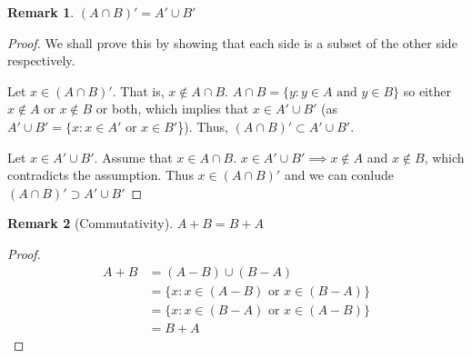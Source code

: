 \documentclass[12pt]{article}
\newtheorem{remark}{Remark}
\begin{document}
\begin{remark}
    $(A \cap B)' = A' \cup B'$
\end{remark}
\begin{proof}
    We shall prove this by showing that each side is a subset of the other side respectively.

    Let $x \in (A \cap B)'$. That is, $x \notin A \cap B$. $A \cap B = \{y: y \in A \text{ and } y \in B\}$
    so either $x \notin A$ or $x \notin B$ or both, which implies that
    $x \in A' \cup B'$ (as $A' \cup B' = \{x: x \in A' \text{ or } x \in B'$\}). Thus, $(A \cap B)' \subset A' \cup B'$.

    Let $x \in A' \cup B'$. Assume that $x \in A \cap B$. $x \in A' \cup B' \implies x \notin A$ and
    $x \notin B$, which contradicts the assumption. Thus $x \in (A \cap B)'$ and we can conlude $(A \cap B)' \supset A' \cup B'$
\end{proof}

\begin{remark}[Commutativity]
    $A + B = B + A$
\end{remark}
\begin{proof}
    \begin{align*}
        A + B &= (A - B) \cup (B - A)\\
              &= \{x: x \in (A - B) \text{ or } x \in (B - A)\}\\
              &= \{x: x \in (B - A) \text{ or } x \in (A - B)\}\\
              &= B + A
    \end{align*}
\end{proof}
\end{document}
